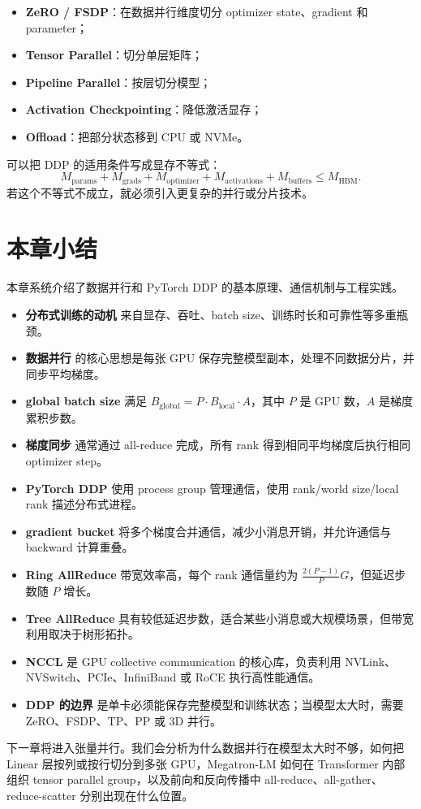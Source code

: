 \begin{itemize}
\item \textbf{ZeRO / FSDP}：在数据并行维度切分 optimizer state、gradient 和 parameter；
\item \textbf{Tensor Parallel}：切分单层矩阵；
\item \textbf{Pipeline Parallel}：按层切分模型；
\item \textbf{Activation Checkpointing}：降低激活显存；
\item \textbf{Offload}：把部分状态移到 CPU 或 NVMe。
\end{itemize}

可以把 DDP 的适用条件写成显存不等式：
\[
M_{\mathrm{params}}
+
M_{\mathrm{grads}}
+
M_{\mathrm{optimizer}}
+
M_{\mathrm{activations}}
+
M_{\mathrm{buffers}}
\le
M_{\mathrm{HBM}}.
\]
若这个不等式不成立，就必须引入更复杂的并行或分片技术。

\section{本章小结}
\label{sec:chapter07-summary}

本章系统介绍了数据并行和 PyTorch DDP 的基本原理、通信机制与工程实践。

\begin{itemize}
\item \textbf{分布式训练的动机} 来自显存、吞吐、batch size、训练时长和可靠性等多重瓶颈。
\item \textbf{数据并行} 的核心思想是每张 GPU 保存完整模型副本，处理不同数据分片，并同步平均梯度。
\item \textbf{global batch size} 满足 $B_{\mathrm{global}}=P\cdot B_{\mathrm{local}}\cdot A$，其中 $P$ 是 GPU 数，$A$ 是梯度累积步数。
\item \textbf{梯度同步} 通常通过 all-reduce 完成，所有 rank 得到相同平均梯度后执行相同 optimizer step。
\item \textbf{PyTorch DDP} 使用 process group 管理通信，使用 rank/world size/local rank 描述分布式进程。
\item \textbf{gradient bucket} 将多个梯度合并通信，减少小消息开销，并允许通信与 backward 计算重叠。
\item \textbf{Ring AllReduce} 带宽效率高，每个 rank 通信量约为 $\frac{2(P-1)}{P}G$，但延迟步数随 $P$ 增长。
\item \textbf{Tree AllReduce} 具有较低延迟步数，适合某些小消息或大规模场景，但带宽利用取决于树形拓扑。
\item \textbf{NCCL} 是 GPU collective communication 的核心库，负责利用 NVLink、NVSwitch、PCIe、InfiniBand 或 RoCE 执行高性能通信。
\item \textbf{DDP 的边界} 是单卡必须能保存完整模型和训练状态；当模型太大时，需要 ZeRO、FSDP、TP、PP 或 3D 并行。
\end{itemize}

下一章将进入张量并行。我们会分析为什么数据并行在模型太大时不够，如何把 Linear 层按列或按行切分到多张 GPU，Megatron-LM 如何在 Transformer 内部组织 tensor parallel group，以及前向和反向传播中 all-reduce、all-gather、reduce-scatter 分别出现在什么位置。
